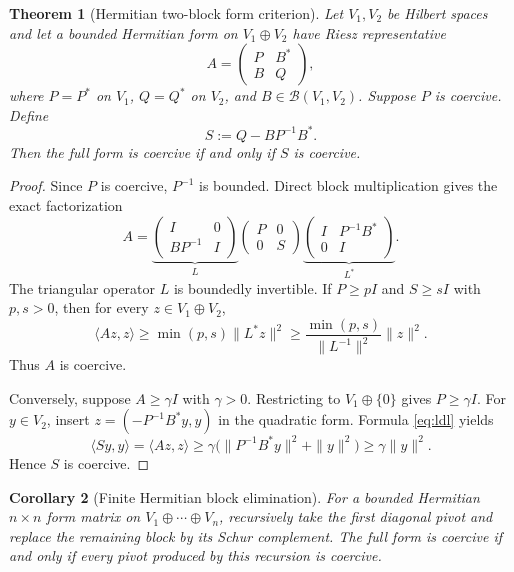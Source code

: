 \documentclass[11pt]{article}
\newtheorem{theorem}{Theorem}
\newtheorem{corollary}[theorem]{Corollary}
\theoremstyle{definition}
\newcommand{\B}{\mathcal B}
\begin{document}
\begin{theorem}[Hermitian two-block form criterion]\label{thm:schur}
Let $V_1,V_2$ be Hilbert spaces and let a bounded Hermitian form on
$V_1\oplus V_2$ have Riesz representative
\[
 A=\begin{pmatrix}P&B^*\\ B&Q\end{pmatrix},
\]
where $P=P^*$ on $V_1$, $Q=Q^*$ on $V_2$, and
$B\in\B(V_1,V_2)$.  Suppose $P$ is coercive.  Define
\[
 S:=Q-BP^{-1}B^*.
\]
Then the full form is coercive if and only if $S$ is coercive.
\end{theorem}

\begin{proof}
Since $P$ is coercive, $P^{-1}$ is bounded.  Direct block multiplication gives
the exact factorization
\begin{equation}\label{eq:ldl}
 A=
 \underbrace{\begin{pmatrix}I&0\\ BP^{-1}&I\end{pmatrix}}_{L}
 \begin{pmatrix}P&0\\0&S\end{pmatrix}
 \underbrace{\begin{pmatrix}I&P^{-1}B^*\\0&I\end{pmatrix}}_{L^*}.
\end{equation}
The triangular operator $L$ is boundedly invertible.  If
$P\ge pI$ and $S\ge sI$ with $p,s>0$, then for every $z\in V_1\oplus V_2$,
\[
 \langle Az,z\rangle
 \ge \min(p,s)\|L^*z\|^2
 \ge \frac{\min(p,s)}{\|L^{-1}\|^2}\|z\|^2.
\]
Thus $A$ is coercive.

Conversely, suppose $A\ge\gamma I$ with $\gamma>0$.  Restricting to
$V_1\oplus\{0\}$ gives $P\ge\gamma I$.  For $y\in V_2$, insert
$z=(-P^{-1}B^*y,y)$ in the quadratic form.  Formula \eqref{eq:ldl} yields
\[
 \langle Sy,y\rangle=\langle Az,z\rangle
 \ge\gamma\bigl(\|P^{-1}B^*y\|^2+\|y\|^2\bigr)
 \ge\gamma\|y\|^2.
\]
Hence $S$ is coercive.
\end{proof}

\begin{corollary}[Finite Hermitian block elimination]\label{cor:recursive}
For a bounded Hermitian $n\times n$ form matrix on
$V_1\oplus\cdots\oplus V_n$, recursively take the first diagonal pivot and
replace the remaining block by its Schur complement.  The full form is
coercive if and only if every pivot produced by this recursion is coercive.
\end{corollary}
\end{document}
